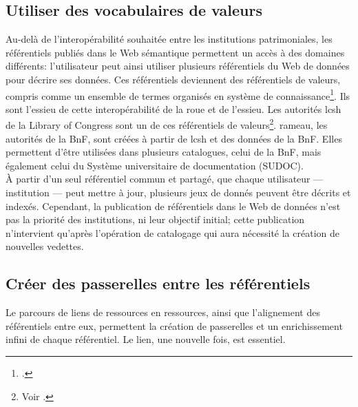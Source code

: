 \subsection{\label{II-A-2-b}Utiliser des vocabulaires de valeurs}

Au-delà de l'interopérabilité souhaitée entre les institutions patrimoniales, les référentiels publiés dans le Web sémantique permettent un accès à des domaines différents: l'utilisateur peut ainsi utiliser plusieurs référentiels du Web de données pour décrire ses données. Ces référentiels deviennent des référentiels de valeurs, compris comme un \og ensemble de termes organisés en système de connaissance\fg{}\footcite[p.47]{dalbin_approches_2011}. Ils sont l'essieu de cette interopérabilité de la roue et de l'essieu. Les autorités \ac{lcsh} de la Library of Congress sont un de ces référentiels de valeurs\footnote{Voir .}. \ac{rameau}, les autorités de la BnF, sont créées à partir de \ac{lcsh} et des données de la BnF. Elles permettent d'être utilisées dans plusieurs catalogues, celui de la BnF, mais également celui du Système universitaire de documentation (SUDOC).\\

À partir d'un seul référentiel commun et partagé, que chaque utilisateur --- institution --- peut mettre à jour, plusieurs jeux de donnés peuvent être décrits et indexés. Cependant, la publication de référentiels dans le Web de données n'est pas la priorité des institutions, ni leur objectif initial; cette publication n'intervient qu'après l'opération de catalogage qui aura nécessité la création de nouvelles vedettes.

\subsection{\label{II-A-2-c}Créer des passerelles entre les référentiels}

Le parcours de liens de ressources en ressources, ainsi que l'alignement des référentiels entre eux, permettent la création de passerelles et un enrichissement infini de chaque référentiel. Le lien, une nouvelle fois, est essentiel.\\

